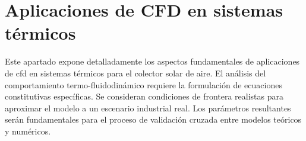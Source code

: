 \section{Aplicaciones de CFD en sistemas térmicos}
\label{sec:cap03_aplicaciones_cfd}

Este apartado expone detalladamente los aspectos fundamentales de aplicaciones de cfd en sistemas térmicos para el colector solar de aire.
El análisis del comportamiento termo-fluidodinámico requiere la formulación de ecuaciones constitutivas específicas.
Se consideran condiciones de frontera realistas para aproximar el modelo a un escenario industrial real.
Los parámetros resultantes serán fundamentales para el proceso de validación cruzada entre modelos teóricos y numéricos.
